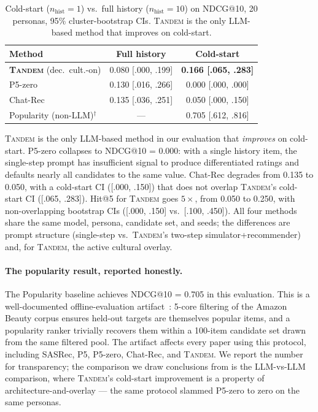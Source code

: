 \documentclass[8pt,twocolumn,a4paper]{extarticle}
\begin{document}
\begin{table}[h]
\centering
\footnotesize
\setlength{\tabcolsep}{3pt}
\caption{Cold-start ($n_{\text{hist}}=1$) vs.\ full history ($n_{\text{hist}}=10$) on NDCG@10, 20 personas, 95\% cluster-bootstrap CIs. \textsc{Tandem} is the only LLM-based method that improves on cold-start.}
\label{tab:coldstart}
\begin{tabular}{lcc}
\toprule
Method                                    & Full history          & Cold-start                       \\
\midrule
\textbf{\textsc{Tandem}} (dec.\ cult.-on) & 0.080 [.000, .199]    & \textbf{0.166 [.065, .283]}      \\
P5-zero                                   & 0.130 [.016, .266]    & 0.000 [.000, .000]               \\
Chat-Rec                                  & 0.135 [.036, .251]    & 0.050 [.000, .150]               \\
\midrule
Popularity (non-LLM)$^{\dagger}$          & ---                   & 0.705 [.612, .816]               \\
\bottomrule
\end{tabular}
\end{table}

\textsc{Tandem} is the only LLM-based method in our evaluation that \emph{improves} on cold-start. P5-zero collapses to NDCG@10 = 0.000: with a single history item, the single-step prompt has insufficient signal to produce differentiated ratings and defaults nearly all candidates to the same value. Chat-Rec degrades from 0.135 to 0.050, with a cold-start CI ([.000, .150]) that does not overlap \textsc{Tandem}'s cold-start CI ([.065, .283]). Hit@5 for \textsc{Tandem} goes $5\times$, from 0.050 to 0.250, with non-overlapping bootstrap CIs ([.000, .150] vs.\ [.100, .450]). All four methods share the same model, persona, candidate set, and seeds; the differences are prompt structure (single-step vs.\ \textsc{Tandem}'s two-step simulator+recommender) and, for \textsc{Tandem}, the active cultural overlay.

\paragraph{The popularity result, reported honestly.}
The Popularity baseline achieves NDCG@10 = 0.705 in this evaluation. This is a well-documented offline-evaluation artifact~\citep{krichene2020sampled}: 5-core filtering of the Amazon Beauty corpus ensures held-out targets are themselves popular items, and a popularity ranker trivially recovers them within a 100-item candidate set drawn from the same filtered pool. The artifact affects every paper using this protocol, including SASRec, P5, P5-zero, Chat-Rec, and \textsc{Tandem}. We report the number for transparency; the comparison we draw conclusions from is the LLM-vs-LLM comparison, where \textsc{Tandem}'s cold-start improvement is a property of architecture-and-overlay --- the same protocol slammed P5-zero to zero on the same personas.
\end{document}
